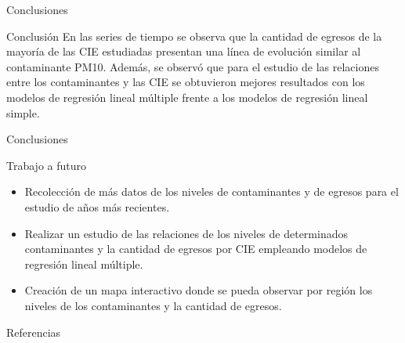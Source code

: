 \documentclass[11pt]{beamer}
\begin{document}
\begin{frame}{Conclusiones}
\begin{block}{Conclusión} \justifying
En las series de tiempo se observa que la cantidad de egresos de la mayoría de las CIE estudiadas presentan
una línea de evolución similar al contaminante PM10.
Además, se observó que para el estudio de las relaciones entre los contaminantes y las CIE se obtuvieron mejores resultados con los modelos de regresión lineal múltiple frente a los modelos de regresión lineal simple.
\end{block}
\end{frame}
\begin{frame}{Conclusiones}
\begin{block}{Trabajo a futuro} \justifying
\begin{itemize}
	\item Recolección de más datos de los niveles de contaminantes y de egresos para el estudio de años más recientes.
	\item Realizar un estudio de las relaciones de los niveles de determinados contaminantes y la cantidad de egresos por CIE empleando modelos de regresión lineal múltiple.
	\item Creación de un mapa interactivo donde se pueda observar por región los niveles de los contaminantes y la cantidad de egresos.
\end{itemize}
\end{block}
\end{frame}


\begin{frame}[allowframebreaks]{Referencias}
\tiny
\end{frame}
\end{document}
